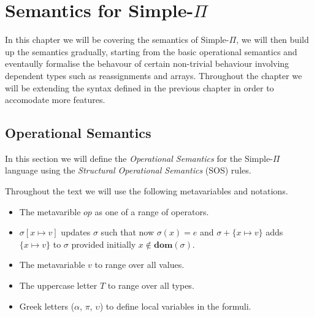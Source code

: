 \documentclass[a4paper,12pt]{report}
\begin{document}
\chapter{Semantics for Simple-$\Pi$}
In this chapter we will be covering the semantics of Simple-$\Pi$, we will 
then build up the semantics gradually, starting from the basic 
operational semantics and eventaully formalise the behavour of certain 
non-trivial behaviour involving dependent types such as reassignments and 
arrays. Throughout the chapter we will be extending the syntax defined in the 
previous chapter in order to accomodate more features.

\section{Operational Semantics}
In this section we will define the \textit{Operational Semantics} 
\cite{operationalSemantics} for the Simple-$\Pi$ language 
using the \textit{Structural Operational Semantics} \cite{plotkinSOS} (SOS) rules. 

\par
Throughout the text we will use the following metavariables and notations. 
\begin{itemize}
  \item The metavarible $op$ as one of a range of operators. 
  \item $\sigma[x \mapsto v]$ updates $\sigma$ such that now $\sigma(x) = e$ and 
  $\sigma + \{x \mapsto v\}$ adds $\{x \mapsto v\}$ to $\sigma$ provided 
  initially $x \notin\textbf{dom}(\sigma)$.
  \item The metavariable $v$ to range over all values.
  \item The uppercase letter $T$ to range over all types.
  \item Greek letters ($\alpha$, $\pi$, $\upsilon$) to define local variables in 
  the formuli. 
\end{itemize}
\end{document}
